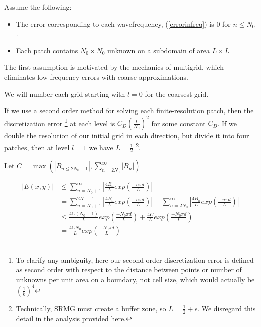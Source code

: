 \documentclass[final]{siamart1116}
\numberwithin{theorem}{section}
\begin{document}

Assume the following: 
\begin{itemize}
\item The error corresponding to each wavefrequency, (\ref{errorinfreq}) is 0 for $n \leq N_0$.
\item Each patch contains $N_0 \times N_0$ unknown on a subdomain of area $L \times L$ 
\end{itemize} 

The first assumption is motivated by the mechanics of multigrid, which eliminates low-frequency errors with coarse approximations. 

We will number each grid starting with $l = 0$ for the coarsest grid. 

If we use a second order method for solving each finite-resolution patch, then the discretization error \footnote{To clarify any ambiguity, here our second order discretization error is defined as second order with respect to the distance between points or number of unknowns per unit area on a boundary, not cell size, which would actually be$(\frac{1}{k})^4$} at each level is $C_D \left(\frac{L}{N_0}\right)^2$ for some constant $C_D$. If we double the resolution of our initial grid in each direction, but divide it into four patches, then at level $l = 1$ we have $L = \frac{1}{2}$ \footnote{Technically, SRMG must create a buffer zone, so $L = \frac{1}{2} + \epsilon$. We disregard this detail in the analysis provided here. }.



Let $C = \max{(|B_{n \leq 2N_0-1}|, \sum_{n=2N_0}^\infty |B_n|) } $

\begin{align}
  \left|E(x, y)\right| &\leq \sum^{\infty}_{n=N_0+1} |\frac{4 B_n}{L} exp(\frac{-n \pi d}{L})|  \nonumber \\  
& = \sum_{n=N_0+1}^{2N_0-1} |\frac{4B_n}{L} exp(\frac{-n \pi d}{L})| + \sum_{n=2N_0}^{\infty} |\frac{4B_n}{L} exp(\frac{-n \pi d}{L}) |  \nonumber \\
&\leq  \frac{4 C (N_0-1)}{L} exp(\frac{-N_0 \pi d}{L}) + \frac{4C}{L} exp(\frac{-N_0 \pi d}{L} ) \nonumber \\  
&= \frac{4C N_0}{L} exp(\frac{-N_0 \pi d}{L}) \nonumber \label{bound}  \\
\end{align}
\end{document}
